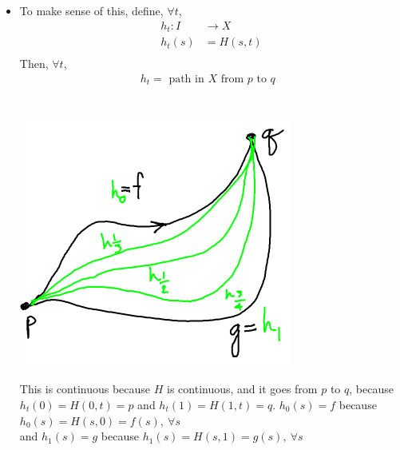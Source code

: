 \documentclass[../notes.tex]{subfiles}
\begin{document}
    \begin{itemize}
        \item
            To make sense of this, define, $\forall t$,
            \begin{align*}
                h_t: I&\rightarrow X\\
                h_t(s)&=H(s,t)\\
            \end{align*}
            Then, $\forall t$,
            \begin{align*}
                h_t= \text{ path in $X$ from $p$ to $q$ }\\
            \end{align*}\\
            \begin{minipage}[c]{\linewidth}
                \begin{center}
                \includegraphics[]{images/homotopy_class.png}
                \end{center}
            \end{minipage}
            This is continuous because $H$ is continuous, and it goes from $p$ to $q$, because $h_t(0)=H(0,t)=p$ and $h_t(1)=H(1,t)=q$.
            $h_0(s)=f$ because $h_0(s)=H(s,0)=f(s),\ \forall s$\\
            and $h_1(s)=g$ because $h_1(s)=H(s,1)=g(s),\ \forall s$\\
    \end{itemize}
\end{document}
